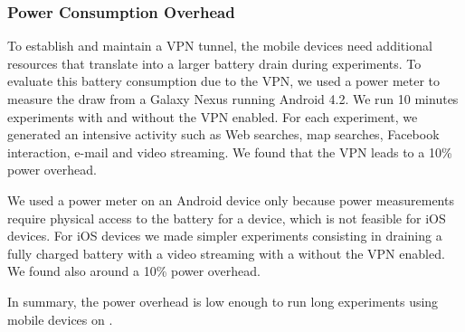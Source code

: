 


\subsubsection{Power Consumption Overhead}
To establish and maintain a VPN tunnel, the mobile devices need
additional resources that translate into a larger battery drain during
experiments. To evaluate this battery consumption due to the VPN, we
used a power meter to measure the draw from a Galaxy Nexus running
Android 4.2. We run 10 minutes experiments with and without the VPN
enabled. For each experiment, we generated an intensive activity such
as Web searches, map searches, Facebook interaction, e-mail and video
streaming. We found that the VPN leads to a 10\% power overhead. 

We used a power meter on an Android device only because power
measurements require physical access to the battery for a device,
which is not feasible for iOS devices. For iOS devices we made
simpler experiments consisting in draining a fully charged battery with
a video streaming with a without the VPN enabled. We found also around
a 10\% power overhead. 

In summary, the power overhead is low enough to run long experiments
using mobile devices on \platname. 



